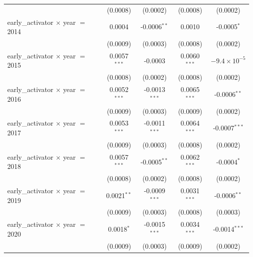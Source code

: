 \begin{tabular}{lcccc}
                                                    & (0.0008)           & (0.0002)                  & (0.0008)             & (0.0002)\\   
   early\_activator $\times$ year $=$ 2014          & 0.0004             & -0.0006$^{**}$            & 0.0010               & -0.0005$^{*}$\\   
                                                    & (0.0009)           & (0.0003)                  & (0.0008)             & (0.0002)\\   
   early\_activator $\times$ year $=$ 2015          & 0.0057$^{***}$     & -0.0003                   & 0.0060$^{***}$       & $-9.4\times 10^{-5}$\\    
                                                    & (0.0008)           & (0.0002)                  & (0.0008)             & (0.0002)\\   
   early\_activator $\times$ year $=$ 2016          & 0.0052$^{***}$     & -0.0013$^{***}$           & 0.0065$^{***}$       & -0.0006$^{**}$\\   
                                                    & (0.0009)           & (0.0003)                  & (0.0009)             & (0.0002)\\   
   early\_activator $\times$ year $=$ 2017          & 0.0053$^{***}$     & -0.0011$^{***}$           & 0.0064$^{***}$       & -0.0007$^{***}$\\   
                                                    & (0.0009)           & (0.0003)                  & (0.0008)             & (0.0002)\\   
   early\_activator $\times$ year $=$ 2018          & 0.0057$^{***}$     & -0.0005$^{**}$            & 0.0062$^{***}$       & -0.0004$^{*}$\\   
                                                    & (0.0008)           & (0.0002)                  & (0.0008)             & (0.0002)\\   
   early\_activator $\times$ year $=$ 2019          & 0.0021$^{**}$      & -0.0009$^{***}$           & 0.0031$^{***}$       & -0.0006$^{**}$\\   
                                                    & (0.0009)           & (0.0003)                  & (0.0008)             & (0.0003)\\   
   early\_activator $\times$ year $=$ 2020          & 0.0018$^{*}$       & -0.0015$^{***}$           & 0.0034$^{***}$       & -0.0014$^{***}$\\   
                                                    & (0.0009)           & (0.0003)                  & (0.0009)             & (0.0002)\\   

\end{tabular}
